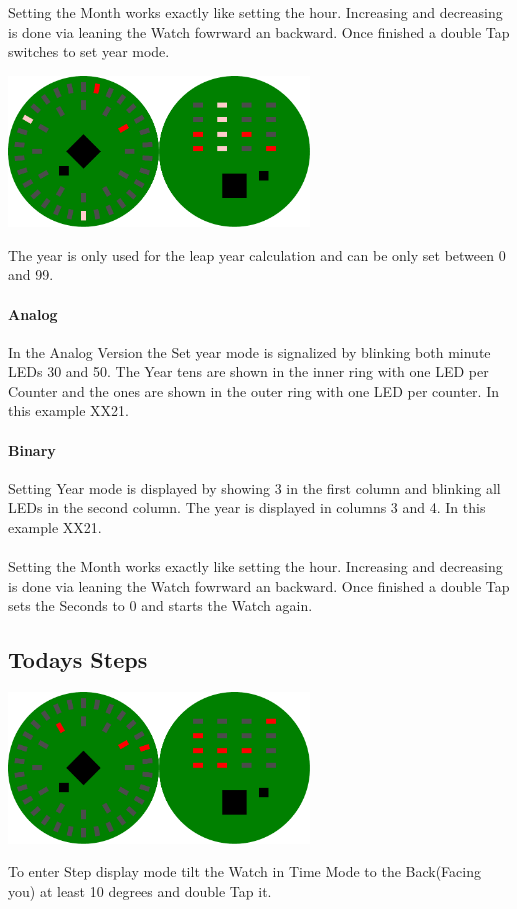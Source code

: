 Setting the Month works exactly like setting the hour. Increasing and decreasing is done via leaning the Watch fowrward an backward. Once finished a double Tap switches to set year mode.
\begin{center}
\includegraphics[width=0.6\textwidth]{../Graphics/Date25_Dez_SetYear21}
\end{center}
The year is only used for the leap year calculation and can be only set between 0 and 99. 
\paragraph{Analog} 
In the Analog Version the Set year mode is signalized by blinking both minute LEDs 30 and 50. The Year tens are shown in the inner ring with one LED per Counter and the ones are shown in the outer ring with one LED per counter. In this example XX21.
\paragraph{Binary}
Setting Year mode is displayed by showing 3 in the first column and blinking all LEDs in the second column. The year is displayed in columns 3 and 4. In this example XX21.\\
\\
Setting the Month works exactly like setting the hour. Increasing and decreasing is done via leaning the Watch fowrward an backward. Once finished a double Tap sets the Seconds to 0 and starts the Watch again.
\subsection{Todays Steps}
\begin{center}
\includegraphics[width=0.6\textwidth]{../Graphics/ShowSteps32768}
\end{center}
To enter Step display mode tilt the Watch in Time Mode to the Back(Facing you) at least 10 degrees and double Tap it.
